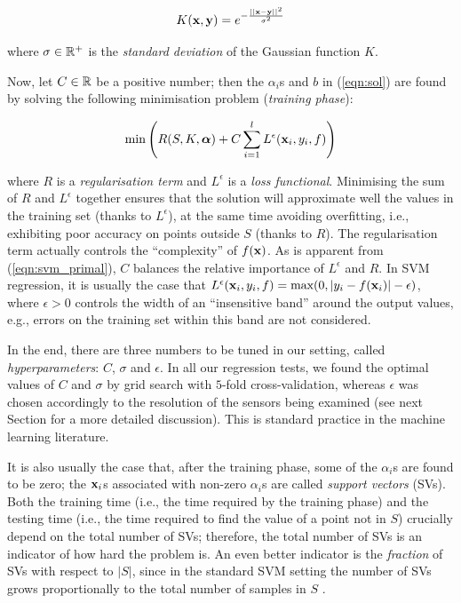\begin{equation} \label{eqn:ker}
  K(\mathbf{x},\mathbf{y}) = e^{-\frac{||\mathbf{x}-\mathbf{y}||^2}{\sigma^2}}
\end{equation}

\noindent where $\sigma \in \mathbb{R}^{+}$ is the \emph{standard deviation} of
the Gaussian function $K$.

Now, let $C \in \mathbb{R}$ be a positive number; then the $\alpha_i$s and
$b$ in (\ref{eqn:sol}) are found by solving the following minimisation
problem (\emph{training phase}):

\begin{equation} \label{eqn:svm_primal}
  \min \left( R(S,K,\boldsymbol{\alpha}) + C \sum_{i=1}^l L^\epsilon (\mathbf{x}_i,y_i,f) \right)
\end{equation}

\noindent where $R$ is a \emph{regularisation term} and
$L^\epsilon$ is a \emph{loss functional}. Minimising the sum of $R$
and $L^\epsilon$ together ensures that the solution will approximate
well the values in the training set (thanks to $L^\epsilon$), at the
same time avoiding overfitting, i.e., exhibiting poor accuracy on
points outside $S$ (thanks to $R$). The regularisation term actually
controls the ``complexity'' of $f(\mathbf{x})$. As is apparent from
(\ref{eqn:svm_primal}), $C$ balances the relative importance of
$L^\epsilon$ and $R$. In SVM regression, it is usually the case that
$L^\epsilon (\mathbf{x}_i,y_i,f) = \mbox{max}(0,|y_i-f(\mathbf{x}_i)|-\epsilon)$,
where $\epsilon > 0$ controls the width of an ``insensitive band''
around the output values, e.g., errors on the training set within this
band are not considered.

In the end, there are three numbers to be tuned in our setting, called
\emph{hyperparameters}: $C$, $\sigma$ and $\epsilon$. In all our
regression tests, we found the optimal values of $C$ and $\sigma$ by
grid search with $5$-fold cross-validation, whereas $\epsilon$ was
chosen accordingly to the resolution of the sensors being examined
(see next Section for a more detailed discussion). This is standard
practice in the machine learning literature.

It is also usually the case that, after the training phase, some of
the $\alpha_i$s are found to be zero; the $\mathbf{x}_i$s associated with
non-zero $\alpha_i$s are called \emph{support vectors} (SVs). Both the
training time (i.e., the time required by the training phase) and the
testing time (i.e., the time required to find the value of a point not
in $S$) crucially depend on the total number of SVs; therefore, the
total number of SVs is an indicator of how hard the problem is. An
even better indicator is the \emph{fraction} of SVs with respect to
$|S|$, since in the standard SVM setting the number of SVs grows
proportionally to the total number of samples in $S$
\cite{Steinwart03}.

